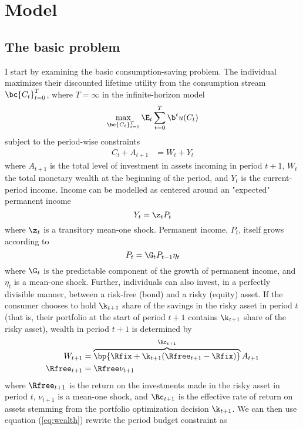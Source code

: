 \section{Model}

\subsection{The basic problem}

I start by examining the basic consumption-saving problem. The individual maximizes their discounted lifetime utility from the consumption stream $\bc{C_{t}}_{t=0}^{T}$, where $T = \infty$ in the infinite-horizon model
\begin{equation}\label{eq:prb}
   \max_{\bc{C_t}_{t=0}^{T}}\E_{t}\sum_{t=0}^{T}\b^t u(C_t)
\end{equation}
subject to the period-wise constraints
\begin{align*}
    C_{t} + A_{t+1} &= W_{t} + Y_{t}
\end{align*}
where $A_{t+1}$ is the total level of investment in assets incoming in period $t+1$, $W_{t}$ the total monetary wealth at the beginning of the period, and $Y_{t}$ is the current-period income. Income can be modelled as centered around an "expected" permanent income
\begin{equation}\label{eq:inc}
    Y_t = \z_t P_t
\end{equation}
where $\z_t$ is a transitory mean-one shock. Permanent income, $P_t$, itself grows according to
\begin{equation}\label{eq:perm_inc}
    P_t = \G_t P_{t-1} \eta_t
\end{equation}
where $\G_t$ is the predictable component of the growth of permanent income, and $\eta_t$ is a mean-one shock. Further, individuals can also invest, in a perfectly divisible manner, between a risk-free (bond) and a risky (equity) asset. If the consumer chooses to hold $\k_{t+1}$ share of the savings in the risky asset in period $t$ (that is, their portfolio at the start of period $t+1$ contains $\k_{t+1}$ share of the risky asset), wealth in period $t+1$ is determined by
\begin{align}
    W_{t+1} &= \overbrace{\bp{\Rfix + \k_{t+1}(\Rfree_{t+1} - \Rfix)}}^{\Rc_{t+1}}A_{t+1} \label{eq:wealth}\\
    \Rfree_{t+1} &= \Rfree \nu_{t+1} \label{eq:return}
\end{align}
where $\Rfree_{t+1}$ is the return on the investments made in the risky asset in period $t$, $\nu_{t+1}$ is a mean-one shock, and $\Rc_{t+1}$ is the effective rate of return on assets stemming from the portfolio optimization decision $\k_{t+1}$. We can then use equation (\ref{eq:wealth}) rewrite the period budget constraint as
